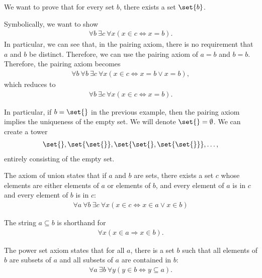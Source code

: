 \documentclass[10pt]{mypackage}
\begin{document}
\begin{example}
  We want to prove that for every set $b$, there exists a set $\set{b}$.\newline

  Symbolically, we want to show
  \begin{align*}
    \forall b\: \exists c\: \forall x \left(x\in c \Leftrightarrow x = b\right).
  \end{align*}
  In particular, we can see that, in the pairing axiom, there is no requirement that $a$ and $b$ be distinct. Therefore, we can use the pairing axiom of $a = b$ and $b = b$. Therefore, the pairing axiom becomes
  \begin{align*}
    \forall b\:\forall b\:\exists c\:\forall x\left(x\in c\Leftrightarrow x = b \vee x = b\right),
  \end{align*}
  which reduces to
  \begin{align*}
    \forall b\:\exists c\:\forall x\left(x\in c \Leftrightarrow x = b\right).
  \end{align*}
\end{example}
In particular, if $b = \set{}$ in the previous example, then the pairing axiom implies the uniqueness of the empty set. We will denote $\set{} = \emptyset$. We can create a tower
\begin{align*}
  \set{}, \set{\set{}}, \set{\set{},\set{\set{}}},\dots,
\end{align*}
entirely consisting of the empty set.
\begin{axiom}[Union]
  The axiom of union states that if $a$ and $b$ are sets, there exists a set $c$ whose elements are either elements of $a$ or elements of $b$, and every element of $a$ is in $c$ and every element of $b$ is in $c$:
  \begin{align*}
    \forall a\: \forall b\:\exists c\:\forall x\left(x\in c \Leftrightarrow x\in a \vee x\in b\right)
  \end{align*}
\end{axiom}
\begin{definition}
  The string $a\subseteq b$ is shorthand for
  \begin{align*}
    \forall x \left(x\in a\Rightarrow x\in b\right).
  \end{align*}
\end{definition}
\begin{axiom}
  The power set axiom states that for all $a$, there is a set $b$ such that all elements of $b$ are subsets of $a$ and all subsets of $a$ are contained in $b$:
  \begin{align*}
    \forall a\:\exists b\:\forall y\left(y\in b \Leftrightarrow y\subseteq a\right).
  \end{align*}
\end{axiom}
\end{document}
